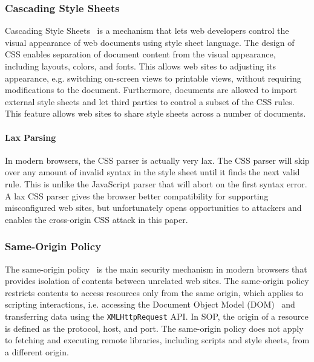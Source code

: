 \documentclass{acm_proc_article-sp}
\begin{document}
\subsubsection{Cascading Style Sheets}
Cascading Style Sheets~\cite{css} is a mechanism that lets web developers control the visual appearance of web documents using style sheet language. The design of CSS enables separation of document content from the visual appearance, including layouts, colors, and fonts. This allows web sites to adjusting its appearance, e.g. switching on-screen views to printable views, without requiring modifications to the document. Furthermore, documents are allowed to import external style sheets and let third parties to control a subset of the CSS rules. This feature allows web sites to share style sheets across a number of documents.

\paragraph{Lax Parsing}
In modern browsers, the CSS parser is actually very lax. The CSS parser will skip over any amount of invalid syntax in the style sheet until it finds the next valid rule. This is unlike the JavaScript parser that will abort on the first syntax error. A lax CSS parser gives the browser better compatibility for supporting misconfigured web sites, but unfortunately opens opportunities to attackers and enables the cross-origin CSS attack in this paper.


\subsubsection{Same-Origin Policy}
The same-origin policy~\cite{mozillasameorigin} is the main security mechanism in modern browsers that provides isolation of contents between unrelated web sites. The same-origin policy restricts contents to access resources only from the same origin, which applies to scripting interactions, i.e. accessing the Document Object Model (DOM)~\cite{dom} and transferring data using the \texttt{XMLHttpRequest} API. In SOP, the origin of a resource is defined as the protocol, host, and port. The same-origin policy does not apply to fetching and executing remote libraries, including scripts and style sheets, from a different origin.
\end{document}
